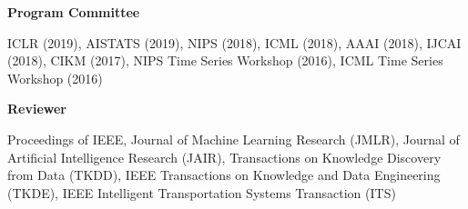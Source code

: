 \documentclass[margin,line]{res}
\newenvironment{list2}{
  \begin{list}{$\bullet$}{%
      \setlength{\itemsep}{0in}
      \setlength{\parsep}{0in} \setlength{\parskip}{0in}
      \setlength{\topsep}{0in} \setlength{\partopsep}{0in} 
      \setlength{\leftmargin}{0.2in}}}{\end{list}}
\begin{document}
\begin{resume}
{\bf Program Committee}

ICLR (2019), AISTATS (2019), NIPS (2018), ICML (2018), AAAI (2018), IJCAI (2018), CIKM (2017), NIPS Time Series Workshop (2016), ICML Time Series Workshop (2016) 


{\bf Reviewer}

Proceedings of IEEE, Journal of Machine Learning Research (JMLR), Journal of Artificial Intelligence Research (JAIR), Transactions on Knowledge Discovery from Data (TKDD), IEEE Transactions on Knowledge and Data Engineering (TKDE),  IEEE Intelligent Transportation Systems Transaction (ITS)




%


%
%
%
%



\end{resume}
\end{document}
